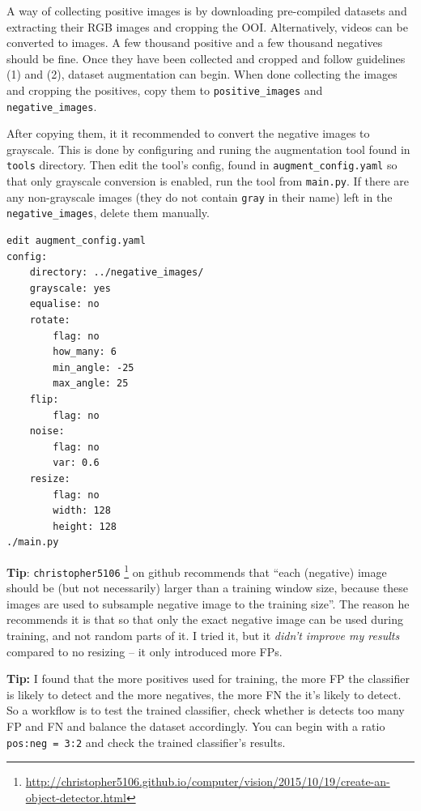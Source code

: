 \documentclass[a4paper]{article}
\begin{document}
A way of collecting positive images is by downloading pre-compiled datasets and extracting their RGB images and cropping the OOI. Alternatively, videos can be converted to images. A few thousand positive and a few thousand negatives should be fine. Once they have been collected and cropped and follow guidelines (1) and (2), dataset augmentation can begin. When done collecting the images and cropping the positives, copy them to \texttt{positive\_images} and \texttt{negative\_images}. 

After copying them, it it recommended to convert the negative images to grayscale. This is done by configuring and runing the augmentation tool found in \texttt{tools} directory. Then edit the tool's config, found in \texttt{augment\_config.yaml} so that only grayscale conversion is enabled, run the tool from \texttt{main.py}. If there are any non-grayscale images (they do not contain \texttt{gray} in their name) left in the \texttt{negative\_images}, delete them manually.
\begin{lstlisting}[style=terminal]
edit augment_config.yaml
config:
    directory: ../negative_images/ 
    grayscale: yes
    equalise: no
    rotate:
        flag: no
        how_many: 6
        min_angle: -25
        max_angle: 25
    flip:
        flag: no
    noise:
        flag: no 
        var: 0.6
    resize:
        flag: no
        width: 128
        height: 128
./main.py
\end{lstlisting}

\textbf{Tip}:  \texttt{christopher5106}   \footnote{\faExternalLinkSquare
 \; \url{http://christopher5106.github.io/computer/vision/2015/10/19/create-an-object-detector.html}} on github recommends that ``each (negative) image should be (but not necessarily) larger than a training window size, because these images are used to subsample negative image to the training size''. The reason he recommends it is that so that only the exact negative image can be used during training, and not random parts of it. I tried it, but it \textit{didn't improve my results} compared to no resizing -- it only introduced more FPs.  
 
\textbf{Tip:} I found that the more positives used for training, the more FP the classifier is likely to detect and the more negatives, the more FN the it's likely to detect. So a workflow is to test the trained classifier, check whether is detects too many FP and FN and balance the dataset accordingly. You can begin with a ratio  \texttt{pos:neg = 3:2}  and check the trained classifier's results.
\end{document}
